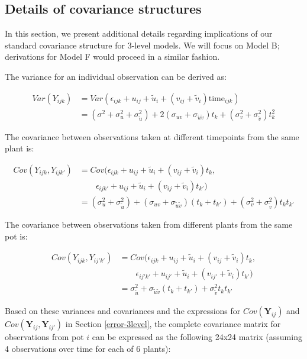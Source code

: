\documentclass[
]{krantz}
\begin{document}
\hypertarget{optionalerror}{%
\subsection{Details of covariance structures}\label{optionalerror}}

In this section, we present additional details regarding implications of our standard covariance structure for 3-level models. We will focus on Model B; derivations for Model F would proceed in a similar fashion.

The variance for an individual observation can be derived as:

\begin{align*}
Var(Y_{ijk}) & = Var(\epsilon_{ijk}+u_{ij}+\tilde{u}_{i}+(v_{ij}+\tilde{v}_{i})\textrm{time}_{ijk}) \\
 & = (\sigma^{2} + \sigma_{u}^{2} + \sigma_{\tilde{u}}^{2}) + 2(\sigma_{uv} + \sigma_{\tilde{u}\tilde{v}})t_k + (\sigma_{v}^{2} + \sigma_{\tilde{v}}^{2})t_{k}^{2}
\end{align*}

The covariance between observations taken at different timepoints from the same plant is:

\begin{align*}
Cov(Y_{ijk},Y_{ijk'}) & = Cov(\epsilon_{ijk}+u_{ij}+\tilde{u}_{i}+(v_{ij}+\tilde{v}_{i})t_{k}, \\
 & \qquad \epsilon_{ijk'}+u_{ij}+\tilde{u}_{i}+(v_{ij}+\tilde{v}_{i})t_{k'}) \\
 & = (\sigma_{u}^{2} + \sigma_{\tilde{u}}^{2}) + (\sigma_{uv} + \sigma_{\tilde{u}\tilde{v}})(t_{k}+t_{k'}) + (\sigma_{v}^{2} + \sigma_{\tilde{v}}^{2})t_{k}t_{k'}
\end{align*}

The covariance between observations taken from different plants from the same pot is:

\begin{align*}
Cov(Y_{ijk},Y_{ij'k'}) & = Cov(\epsilon_{ijk}+u_{ij}+\tilde{u}_{i}+(v_{ij}+\tilde{v}_{i})t_{k}, \\
 & \qquad \epsilon_{ij'k'}+u_{ij'}+\tilde{u}_{i}+(v_{ij'}+\tilde{v}_{i})t_{k'}) \\
 & = \sigma_{\tilde{u}}^{2} + \sigma_{\tilde{u}\tilde{v}}(t_{k}+t_{k'}) + \sigma_{\tilde{v}}^{2}t_{k}t_{k'}
\end{align*}

Based on these variances and covariances and the expressions for \(Cov(\textbf{Y}_{ij})\) and \(Cov(\textbf{Y}_{ij},\textbf{Y}_{ij'})\) in Section \ref{error-3level}, the complete covariance matrix for observations from pot \(i\) can be expressed as the following 24x24 matrix (assuming 4 observations over time for each of 6 plants):
\end{document}
